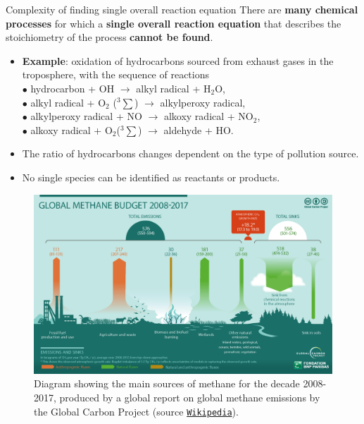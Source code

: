 \begin{frame}[<+->]{Complexity of finding single overall reaction equation}
	\small
	There are {\bf many chemical processes} for which a {\bf single overall reaction equation}
	that describes the stoichiometry of the process \alert{{\bf cannot be found}}.
	\lcol
		\begin{itemize}
		\item {\bf Example}: \alert{oxidation of hydrocarbons sourced from exhaust gases in the troposphere}, 
		with the sequence of reactions \\[5pt]
		{
			\scriptsize
			$\bullet$ hydrocarbon + OH $\rightarrow$ alkyl radical + H$_2$O, \\[3pt]
			$\bullet$ alkyl radical + O$_2$ ($^3\sum$) $\rightarrow$ alkylperoxy radical, \\[3pt]
			$\bullet$ alkylperoxy radical + NO $\rightarrow$ alkoxy radical + NO$_2$, \\[3pt]
			$\bullet$ alkoxy radical + O$_2$($^3\sum$) $\rightarrow$ aldehyde + HO. \\[3pt]
		}
		\item The ratio of hydrocarbons changes dependent on the type of pollution source.
		\item No single species can be identified as reactants or products.
		\end{itemize}

	
	\rcol
	
	\begin{figure}
		\vskip 5pt
		\centering
		\includegraphics[height=0.5\columnwidth]{figures/chemical-kinetics/methane-sources.png}
		\caption{Diagram showing the main sources of methane for the decade 2008-2017, 
			produced by a global report on global methane emissions by the Global Carbon Project 
			(source \href{https://en.wikipedia.org/wiki/Atmospheric_methane}{\textcolor{indigo(dye)}{\tt Wikipedia}}).}
	\end{figure}
	
	\ecol
\end{frame}
